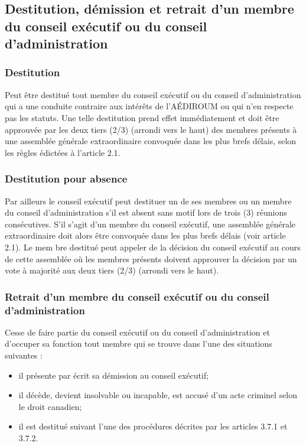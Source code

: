 \documentclass[12pt]{article}
\begin{document}
\subsection{Destitution, démission et retrait d'un membre du conseil exécutif ou du conseil d'administration}
\subsubsection{Destitution}

Peut être destitué tout membre du conseil exécutif ou du conseil d'administration qui a une conduite contraire aux intérêts de l'AÉDIROUM ou qui n'en respecte pas les statuts. Une telle destitution prend effet immédiatement et doit être approuvée par les deux tiers (2/3) (arrondi vers le haut) des membres présents à une assemblée générale extraordinaire convoquée dans les plus brefs délais, selon les règles édictées à l'article 2.1.

\subsubsection{Destitution pour absence}

Par ailleurs le conseil exécutif peut destituer un de ses membres ou un membre du conseil d'administration s'il est absent sans motif lors de trois (3) réunions consécutives. S'il s'agit d'un membre du conseil exécutif, une assemblée générale extraordinaire doit alors être convoquée dans les plus brefs délais (voir article 2.1). Le mem
bre destitué peut appeler de la décision du conseil exécutif au cours de cette assemblée où les membres présents doivent approuver la décision par un vote à majorité aux deux tiers (2/3) (arrondi vers le haut).

\subsubsection{Retrait d'un membre du conseil exécutif ou du conseil d'administration}

Cesse de faire partie du conseil exécutif ou du conseil d'administration et d'occuper sa fonction tout membre qui se trouve dans l'une des situations suivantes :
  \begin{itemize}
  \item il présente par écrit sa démission au conseil exécutif;
  \item il décède, devient insolvable ou incapable, est accusé d'un acte criminel selon le droit canadien;
  \item il est destitué suivant l'une des procédures décrites par les articles 3.7.1 et 3.7.2.
  \end{itemize}
\end{document}
